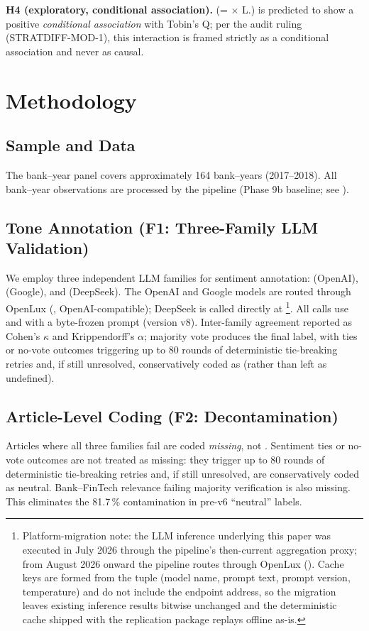 \textbf{H4 (exploratory, conditional association).}
 (=  $\times$
L.) is predicted to show a positive
\emph{conditional association} with Tobin's Q; per the audit ruling
(STRATDIFF-MOD-1), this interaction is framed strictly as a
conditional association and never as causal.

\section{Methodology}\label{sec:method}
\subsection{Sample and Data}
The bank--year panel covers approximately 164 bank--years
(2017--2018). All bank--year observations are processed by the
 pipeline (Phase 9b baseline; see
).

\subsection{Tone Annotation (F1: Three-Family LLM Validation)}
We employ three independent LLM families for sentiment annotation:
 (OpenAI), 
(Google), and  (DeepSeek). The OpenAI and
Google models are routed through OpenLux (,
OpenAI-compatible); DeepSeek is called directly at
\footnote{Platform-migration note: the LLM inference underlying this
paper was executed in July 2026 through the pipeline's then-current
aggregation proxy; from August 2026 onward the pipeline routes through
OpenLux (). Cache keys are formed from
the tuple (model name, prompt text, prompt version, temperature) and do
not include the endpoint address, so the migration leaves existing
inference results bitwise unchanged and the deterministic cache shipped
with the replication package replays offline as-is.}. All calls use  and
 with a byte-frozen prompt (version v8). Inter-family agreement reported as
Cohen's $\kappa$ and Krippendorff's $\alpha$; majority vote produces the
final label, with ties or no-vote outcomes triggering up to 80 rounds of
deterministic tie-breaking retries and, if still unresolved, conservatively
coded as  (rather than left as undefined).

\subsection{Article-Level Coding (F2: Decontamination)}
Articles where all three families fail are coded \emph{missing}, not
. Sentiment ties or no-vote outcomes are not treated as
missing: they trigger up to 80 rounds of deterministic tie-breaking
retries and, if still unresolved, are conservatively coded as neutral.
Bank--FinTech relevance failing majority verification is also missing.
This eliminates the 81.7\,\%
contamination in pre-v6 ``neutral'' labels.

